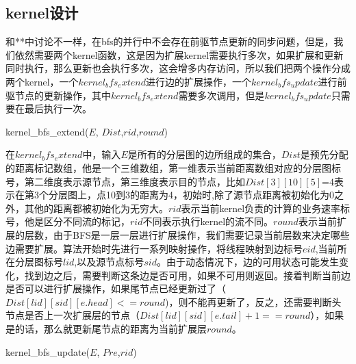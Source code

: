 \subsection{kernel设计}
  和**中讨论不一样，在bfs的并行中不会存在前驱节点更新的同步问题，但是，我们依然需要两个kernel函数，这是因为扩展kernel需要执行多次，如果扩展和更新同时执行，那么更新也会执行多次，这会增多内存访问，所以我们把两个操作分成两个kernel，一个$kernel_bfs_extend$进行边的扩展操作，一个$kernel_bfs_update$进行前驱节点的更新操作，其中$kernel_bfs_extend$需要多次调用，但是$kernel_bfs_update$只需要在最后执行一次。
\begin{algorithm}[t]
\begin{algorithmic}[1]
\caption{\small{kernel\_bfs\_extend($E$, $Dist$,$rid$,$round$)}}
\label{KernelBFS}
\EndIf
{}
\EndIf
\Return
\end{algorithmic}
\end{algorithm} 
 在$kernel_bfs_extend$中，输入$E$是所有的分层图的边所组成的集合，$Dist$是预先分配的距离标记数组，他是一个三维数组，第一维表示当前距离数组对应的分层图标号，第二维度表示源节点，第三维度表示目的节点，比如$Dist[3][10][5]$=4表示在第3个分层图上，点10到3的距离为4，初始时,除了源节点距离被初始化为0之外，其他的距离都被初始化为无穷大。$rid$表示当前kernel负责的计算的业务速率标号，他是区分不同流的标记，$rid$不同表示执行kernel的流不同。$round$表示当前扩展的层数，由于BFS是一层一层进行扩展操作，我们需要记录当前层数来决定哪些边需要扩展。算法开始时先进行一系列映射操作，将线程映射到边标号$eid$,当前所在分层图标号$lid$,以及源节点标号$sid$。由于动态情况下，边的可用状态可能发生变化，找到边之后，需要判断这条边是否可用，如果不可用则返回。接着判断当前边是否可以进行扩展操作，如果尾节点已经更新过了（$Dist[lid][sid][e.head]<=round$)，则不能再更新了，反之，还需要判断头节点是否上一次扩展层的节点（$Dist[lid][sid][e.tail]+1==round$），如果是的话，那么就更新尾节点的距离为当前扩展层$round$。
\begin{algorithm}[t]
\begin{algorithmic}[1]
\caption{\small{kernel\_bfs\_update($E$, $Pre$,$rid$)}}
\label{KernelBFS}
\EndIf
{}
\EndIf
\Return
\end{algorithmic}
\end{algorithm} 
